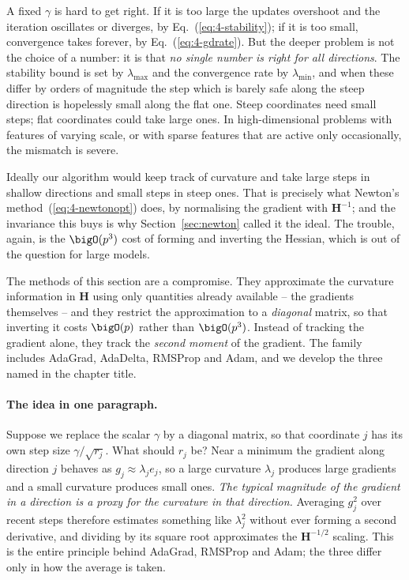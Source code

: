 A fixed $\gamma$ is hard to get right.  If it is too large the updates overshoot
and the iteration oscillates or diverges, by Eq.~(\ref{eq:4-stability}); if it
is too small, convergence takes forever, by Eq.~(\ref{eq:4-gdrate}).  But the
deeper problem is not the choice of a number: it is that \emph{no single
number is right for all directions}.  The stability bound is set by
$\lambda_{\max}$ and the convergence rate by $\lambda_{\min}$, and when these
differ by orders of magnitude the step which is barely safe along the steep
direction is hopelessly small along the flat one.  Steep coordinates need
small steps; flat coordinates could take large ones.  In high-dimensional
problems with features of varying scale, or with sparse features that are
active only occasionally, the mismatch is severe.

Ideally our algorithm would keep track of curvature and take large steps in
shallow directions and small steps in steep ones.  That is precisely what
Newton's method~(\ref{eq:4-newtonopt}) does, by normalising the gradient with
$\bm{H}^{-1}$; and the invariance this buys is why
Section~\ref{sec:newton} called it the ideal.  The trouble, again, is the
$\bigO(p^{3})$ cost of forming and inverting the Hessian, which is out of the
question for large models.

The methods of this section are a compromise.  They approximate the curvature
information in $\bm{H}$ using only quantities already available -- the
gradients themselves -- and they restrict the approximation to a
\emph{diagonal} matrix, so that inverting it costs $\bigO(p)$ rather than
$\bigO(p^{3})$.  Instead of tracking the gradient alone, they track the
\emph{second moment} of the gradient.  The family includes AdaGrad, AdaDelta,
RMSProp and Adam, and we develop the three named in the chapter title.

\paragraph{The idea in one paragraph.}
Suppose we replace the scalar $\gamma$ by a diagonal matrix, so that coordinate
$j$ has its own step size $\gamma/\sqrt{r_j}$.  What should $r_j$ be?  Near a
minimum the gradient along direction $j$ behaves as $g_j\approx\lambda_j e_j$,
so a large curvature $\lambda_j$ produces large gradients and a small
curvature produces small ones.  \emph{The typical magnitude of the gradient in
a direction is a proxy for the curvature in that direction.}  Averaging
$g_j^{2}$ over recent steps therefore estimates something like $\lambda_j^{2}$
without ever forming a second derivative, and dividing by its square root
approximates the $\bm{H}^{-1/2}$ scaling.  This is the entire principle behind
AdaGrad, RMSProp and Adam; the three differ only in how the average is taken.

